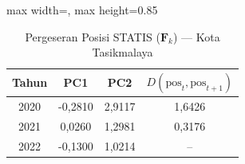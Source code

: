 \begin{table}[H]
\centering
\caption{Pergeseran Posisi STATIS ($\mathbf{F}_k$) --- Kota Tasikmalaya} \label{tab:sample1jarak_statis_skor_kota_tasikmalaya}
\begin{adjustbox}{max width=\textwidth, max height=0.85\textheight}
\begin{tabular}{|c|c|c|c|}
\hline
\textbf{Tahun} & \textbf{PC1} & \textbf{PC2} & \textbf{$D(\text{pos}_t, \text{pos}_{t+1})$} \\
\hline
2020 & -0,2810 & 2,9117 & 1,6426 \\
2021 & 0,0260 & 1,2981 & 0,3176 \\
2022 & -0,1300 & 1,0214 & -- \\
\hline
\end{tabular}
\end{adjustbox}
\end{table}